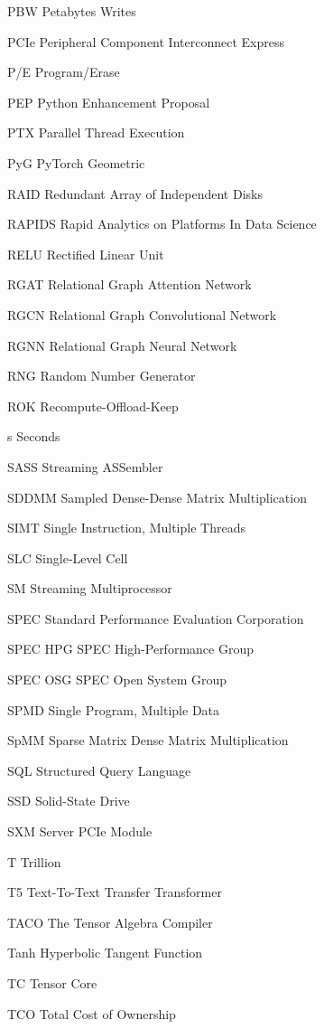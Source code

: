 \begin{symbollist*}
\item[PBW] Petabytes Writes
\item[PCIe] Peripheral Component Interconnect Express
\item[P/E] Program/Erase
\item[PEP] Python Enhancement Proposal
\item[PTX] Parallel Thread Execution
\item[PyG] PyTorch Geometric
\item[RAID] Redundant Array of Independent Disks
\item[RAPIDS] Rapid Analytics on Platforms In Data Science
\item[RELU] Rectified Linear Unit
\item[RGAT] Relational Graph Attention Network 
\item[RGCN] Relational Graph Convolutional Network
\item[RGNN] Relational Graph Neural Network
\item[RNG] Random Number Generator
\item[ROK] Recompute-Offload-Keep
\item[s] Seconds
\item[SASS] Streaming ASSembler
\item[SDDMM] Sampled Dense-Dense Matrix Multiplication
\item[SIMT] Single Instruction, Multiple Threads
\item[SLC] Single-Level Cell
\item[SM] Streaming Multiprocessor
\item[SPEC] Standard Performance Evaluation Corporation
\item[SPEC HPG] SPEC High-Performance Group
\item[SPEC OSG] SPEC Open System Group
\item[SPMD] Single Program, Multiple Data
\item[SpMM] Sparse Matrix Dense Matrix Multiplication
\item[SQL] Structured Query Language
\item[SSD] Solid-State Drive
\item[SXM] Server PCIe Module
\item[T] Trillion
\item[T5] Text-To-Text Transfer Transformer
\item[TACO] The Tensor Algebra Compiler
\item[Tanh] Hyperbolic Tangent Function
\item[TC] Tensor Core
\item[TCO] Total Cost of Ownership

\end{symbollist*}
